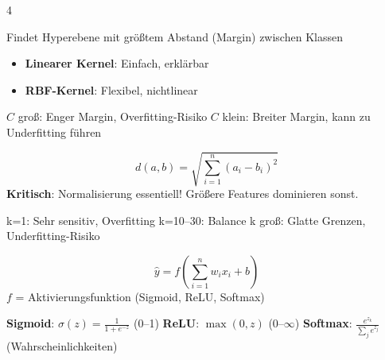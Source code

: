 \begin{landscape}
\begin{multicols*}{4}

		\begin{cheatSheetBox}[title=SVM-Grundkonzept]
			Findet Hyperebene mit größtem Abstand (Margin) zwischen Klassen
			\begin{itemize}
				\item \textbf{Linearer Kernel}: Einfach, erklärbar
				\item \textbf{RBF-Kernel}: Flexibel, nichtlinear
			\end{itemize}
		\end{cheatSheetBox}

		\begin{cheatSheetBox}[title=Parameter C (Regularisierung)]
			$C$ groß: Enger Margin, Overfitting-Risiko
			$C$ klein: Breiter Margin, kann zu Underfitting führen
		\end{cheatSheetBox}


		\begin{cheatSheetBox}[title=Euklidische Distanz]
			\[
				d(a, b) = \sqrt{\sum_{i=1}^n (a_i - b_i)^2}
			\]
			\textbf{Kritisch}: Normalisierung essentiell! Größere Features dominieren sonst.
		\end{cheatSheetBox}

		\begin{cheatSheetBox}[title=Hyperparameter k]
			k=1: Sehr sensitiv, Overfitting
			k=10--30: Balance
			k groß: Glatte Grenzen, Underfitting-Risiko
		\end{cheatSheetBox}

		\columnbreak


		\begin{cheatSheetBox}[title=Perceptron (Einzelneuron)]
			\[
				\hat{y} = f\left(\sum_{i=1}^{n} w_i x_i + b\right)
			\]
			$f$ = Aktivierungsfunktion (Sigmoid, ReLU, Softmax)
		\end{cheatSheetBox}

		\begin{cheatSheetBox}[title=Aktivierungsfunktionen]
			\textbf{Sigmoid}: $\sigma(z)=\frac{1}{1+e^{-z}}$ (0--1)
			\textbf{ReLU}: $\max(0,z)$ (0--$\infty$)
			\textbf{Softmax}: $\frac{e^{z_k}}{\sum_j e^{z_j}}$ (Wahrscheinlichkeiten)
		\end{cheatSheetBox}


\end{multicols*}
\end{landscape}
